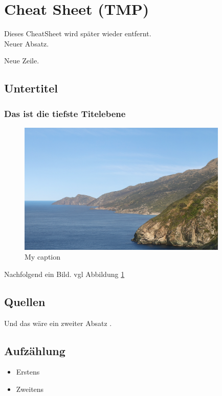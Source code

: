 \section{Cheat Sheet (TMP)}
Dieses CheatSheet wird später wieder entfernt. \\

Neuer Absatz.

Neue Zeile.

\subsection{Untertitel}
\subsubsection{Das ist die tiefste Titelebene}
\begin{figure}[!h]
    \centering
    \includegraphics[width=100mm]{images/musterBild.png}
    \caption{My caption}
    \label{fig:bsp}
\end{figure}
Nachfolgend ein Bild.
vgl Abbildung \ref{fig:bsp}

\subsection{Quellen}
Und das wäre ein zweiter Absatz \cite{good}.

\subsection{Aufzählung}
\begin{itemize}
    \item Erstens
    \item Zweitens
\end{itemize}

